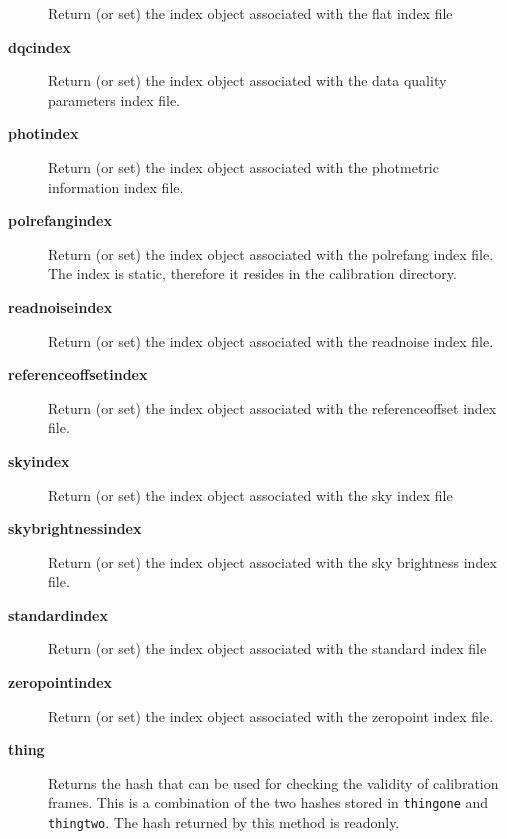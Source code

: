 \begin{description}
Return (or set) the index object associated with the flat index file


\item[{\textbf{dqcindex}}] \mbox{}

Return (or set) the index object associated with the data quality
parameters index file.


\item[{\textbf{photindex}}] \mbox{}

Return (or set) the index object associated with the photmetric
information index file.


\item[{\textbf{polrefangindex}}] \mbox{}

Return (or set) the index object associated with the polrefang index file.
The index is static, therefore it resides in the calibration directory.


\item[{\textbf{readnoiseindex}}] \mbox{}

Return (or set) the index object associated with the readnoise index file.


\item[{\textbf{referenceoffsetindex}}] \mbox{}

Return (or set) the index object associated with the referenceoffset index file.


\item[{\textbf{skyindex}}] \mbox{}

Return (or set) the index object associated with the sky index file


\item[{\textbf{skybrightnessindex}}] \mbox{}

Return (or set) the index object associated with the sky brightness
index file.


\item[{\textbf{standardindex}}] \mbox{}

Return (or set) the index object associated with the standard index file


\item[{\textbf{zeropointindex}}] \mbox{}

Return (or set) the index object associated with the zeropoint index file.


\item[{\textbf{thing}}] \mbox{}

Returns the hash that can be used for checking the validity of
calibration frames. This is a combination of the two hashes
stored in \texttt{thingone} and \texttt{thingtwo}. The hash returned
by this method is readonly.


\end{description}
